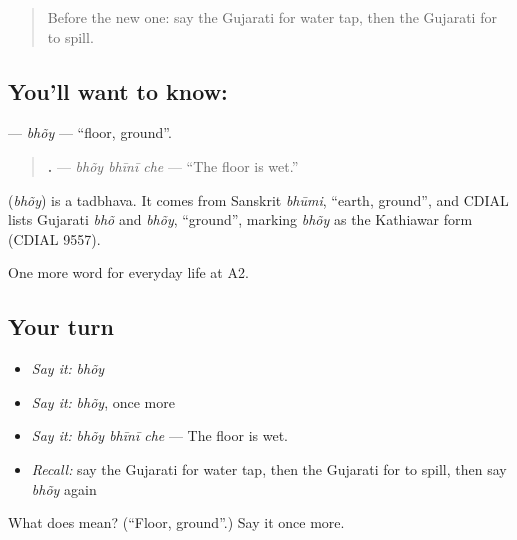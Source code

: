\label{lesson:GU-C159-bhoy}



\begin{quote}
Before the new one: say the Gujarati for water tap, then the Gujarati for to spill.
\end{quote}

\subsection*{You'll want to know: }
\textbf{} — \emph{bhõy} — \textquotedblleft{}floor, ground\textquotedblright{}.

\begin{quote}
\textbf{  .} — \emph{bhõy bhīnī che} — \textquotedblleft{}The floor is wet.\textquotedblright{}
\end{quote}

\begin{cousinweb}
\textbf{} (\emph{bhõy}) is a tadbhava. It comes from Sanskrit \emph{bhūmi}, \textquotedblleft{}earth, ground\textquotedblright{}, and CDIAL lists Gujarati \emph{bhõ} and \emph{bhõy}, \textquotedblleft{}ground\textquotedblright{}, marking \emph{bhõy} as the Kathiawar form (CDIAL 9557).
\end{cousinweb}

\begin{grammarlens}[title={What you've built}]
One more word for everyday life at A2.
\end{grammarlens}

\subsection*{Your turn}
\begin{itemize}
\raggedright
  \item \emph{Say it:} \emph{bhõy}
  \item \emph{Say it:} \emph{bhõy}, once more
  \item \emph{Say it:} \emph{bhõy bhīnī che} — The floor is wet.
  \item \emph{Recall:} say the Gujarati for water tap, then the Gujarati for to spill, then say \emph{bhõy} again
\end{itemize}

\begin{tcolorbox}[breakable,colback=teal!4,colframe=teal!35!black,title={Before you move on}]
What does  mean? (\textquotedblleft{}Floor, ground\textquotedblright{}.) Say it once more.
\end{tcolorbox}
